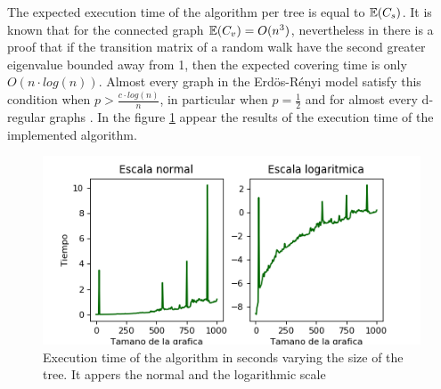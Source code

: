 The expected execution time of the algorithm per tree is equal to $\mathbb{E}(C_{s})$. It is known that for the connected graph $\mathbb{E}(C_{v}) = O(n^{3})$, nevertheless in \cite{boundsoncovertime} there is a proof that if the transition matrix of a random walk have the second greater eigenvalue bounded away from 1, then the expected covering time is only $O(n\cdot log(n))$. Almost every graph in the Erdös-Rényi model satisfy this condition when $p > \frac{c\cdot log(n)}{n}$, in particular when $p=\frac{1}{2}$ and for almost every d-regular graphs \cite{secondEigenValue}. 
In the figure \ref{fig:tiemposGEN} appear the results of the execution time of the implemented algorithm.
\begin{figure}[h!]
	\centering
	\includegraphics[scale=0.8]{Python/Figures/Time-generate.png}
	\caption{ Execution time of the algorithm in seconds varying the size of the tree. It appers the normal and the logarithmic scale}
	\label{fig:tiemposGEN}
\end{figure}
